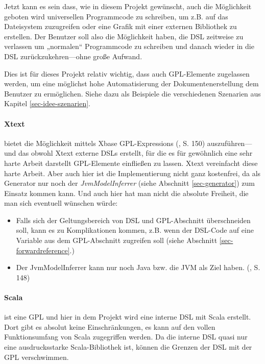 Jetzt kann es sein dass, wie in diesem Projekt gewünscht,
auch die Möglichkeit geboten wird universellen Programmcode zu schreiben,
um z.B. auf das Dateisystem zuzugreifen oder eine Grafik mit einer
externen Bibliothek zu erstellen. Der Benutzer soll also die
Möglichkeit haben, die DSL zeitweise zu verlassen um „normalen“ Programmcode
zu schreiben und danach wieder in die DSL zurückzukehren---ohne große
Aufwand.

Dies ist für dieses Projekt relativ wichtig, dass auch GPL-Elemente zugelassen
werden, um eine möglichst hohe Automatisierung der Dokumentenerstellung
dem Benutzer zu ermöglichen. Siehe dazu als Beispiele
die verschiedenen Szenarien aus Kapitel \ref{sec-idee-szenarien}.

\paragraph{Xtext} bietet die Möglichkeit mittels Xbase GPL-Expressions
(\cite{xtext}, S. 150)
auszuführen---und das obwohl Xtext externe DSLs erstellt, für die es für
gewöhnlich eine sehr harte Arbeit darstellt GPL-Elemente einfließen zu lassen.
Xtext vereinfacht diese harte Arbeit. Aber auch hier ist die Implementierung
nicht ganz kostenfrei, da als Generator nur noch der \emph{JvmModelInferrer}
(siehe Abschnitt \ref{sec-generator}) zum Einsatz kommen kann.
Und auch hier hat man nicht die absolute Freiheit, die man sich eventuell
wünschen würde:

\begin{itemize}
  \item Falls sich der Geltungsbereich von DSL und GPL-Abschnitt überschneiden
        soll, kann es zu Komplikationen kommen, z.B. wenn der DSL-Code
        auf eine Variable aus dem GPL-Abschnitt zugreifen soll (siehe
        Abschnitt \ref{sec-forwardreference}.)
  \item Der JvmModelInferrer kann nur noch Java bzw. die JVM als Ziel haben.
        (\cite{xtext}, S. 148)
\end{itemize}

\paragraph{Scala} ist eine GPL und hier in dem Projekt wird eine interne
DSL mit Scala erstellt. Dort gibt es absolut keine Einschränkungen, es
kann auf den vollen Funktionsumfang von Scala zugegriffen werden.
Da die interne DSL quasi nur eine ausdrucksstarke Scala-Bibliothek ist,
können die Grenzen der DSL mit der GPL verschwimmen.


